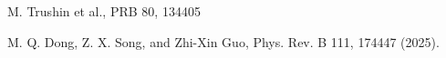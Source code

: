 \documentclass[prb,showpacs,amsmath,amssymb,superscriptaddress,twocolumn,floatfix]{revtex4-1}
\begin{document}
\begin{thebibliography}{99}





 M. Trushin et al., PRB 80, 134405

 M. Q. Dong, Z. X. Song, and Zhi-Xin Guo,
   Phys. Rev. B 111, 174447 (2025).
  
\end{thebibliography}
\end{document}
